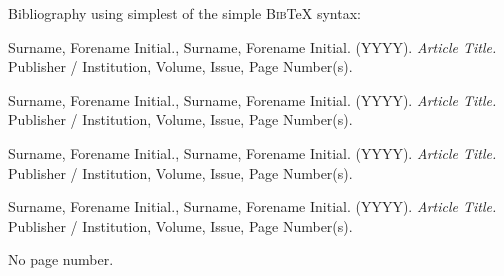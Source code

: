 \documentclass[11pt, english]{article}
\begin{document}
\newpage      

        Bibliography using simplest of the simple \textsc{Bib}{\TeX} syntax:

\renewcommand\refname{Bibliography}
                          
\begin{thebibliography}{9}                                                                                                                           
                                                                                                                                                    
                Surname, Forename Initial., Surname, Forename Initial. (YYYY).
                \textsl{Article Title.}                                
                Publisher / Institution, Volume, Issue, Page Number(s).

                Surname, Forename Initial., Surname, Forename Initial. (YYYY).
                \textsl{Article Title.}                                
                Publisher / Institution, Volume, Issue, Page Number(s).
	
                Surname, Forename Initial., Surname, Forename Initial. (YYYY).
                \textsl{Article Title.}                                
                Publisher / Institution, Volume, Issue, Page Number(s).

                Surname, Forename Initial., Surname, Forename Initial. (YYYY).
                \textsl{Article Title.}                                
                Publisher / Institution, Volume, Issue, Page Number(s).

\end{thebibliography}

\newpage


	No page number.

\newpage 
\end{document}
